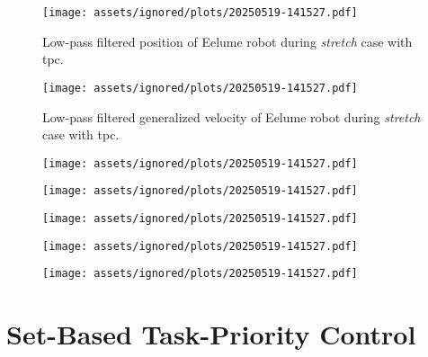 \begin{figure}[!ht]
    \centering
    \texttt{[image: assets/ignored/plots/20250519-141527.pdf]}
    \label{fig:results:tpc:stretch:1:pos}
    \caption{Low-pass filtered position of Eelume robot during \textit{stretch} case with \gls{tpc}.}
\end{figure}
\begin{figure}[!ht]
    \centering
    \texttt{[image: assets/ignored/plots/20250519-141527.pdf]}
    \label{fig:results:tpc:stretch:1:vel}
    \caption{Low-pass filtered generalized velocity of Eelume robot during \textit{stretch} case with \gls{tpc}.}
\end{figure}
\begin{figure}[!ht]
    \centering
    \texttt{[image: assets/ignored/plots/20250519-141527.pdf]}
    \label{fig:results:tpc:stretch:1:forces}
    \caption{}
\end{figure}
\begin{figure}[!ht]
    \centering
    \texttt{[image: assets/ignored/plots/20250519-141527.pdf]}
    \label{fig:results:tpc:stretch:1:forces-torques}
    \caption{}
\end{figure}
\begin{figure}[!ht]
    \centering
    \texttt{[image: assets/ignored/plots/20250519-141527.pdf]}
    \label{fig:results:tpc:stretch:1:task:1}
    \caption{}
\end{figure}
\begin{figure}[!ht]
    \centering
    \texttt{[image: assets/ignored/plots/20250519-141527.pdf]}
    \label{fig:results:tpc:stretch:1:task:2}
    \caption{}
\end{figure}
\begin{figure}[!ht]
    \centering
    \texttt{[image: assets/ignored/plots/20250519-141527.pdf]}
    \label{fig:results:tpc:stretch:1:task:3}
    \caption{}
\end{figure}

\FloatBarrier

\section{Set-Based Task-Priority Control}





